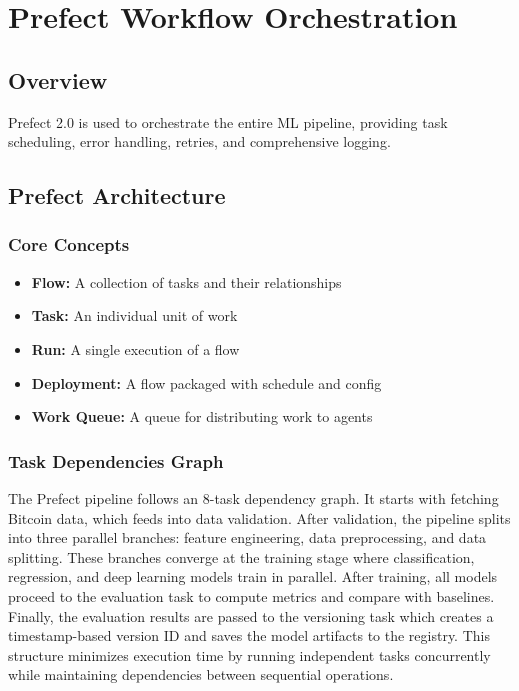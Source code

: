\chapter{Prefect Workflow Orchestration}
\label{ch:prefect}

\section{Overview}

Prefect 2.0 is used to orchestrate the entire ML pipeline, providing task scheduling, error handling, retries, and comprehensive logging.

\section{Prefect Architecture}

\subsection{Core Concepts}

\begin{itemize}
    \item \textbf{Flow:} A collection of tasks and their relationships
    \item \textbf{Task:} An individual unit of work
    \item \textbf{Run:} A single execution of a flow
    \item \textbf{Deployment:} A flow packaged with schedule and config
    \item \textbf{Work Queue:} A queue for distributing work to agents
\end{itemize}

\subsection{Task Dependencies Graph}

The Prefect pipeline follows an 8-task dependency graph. It starts with fetching Bitcoin data, which feeds into data validation. After validation, the pipeline splits into three parallel branches: feature engineering, data preprocessing, and data splitting. These branches converge at the training stage where classification, regression, and deep learning models train in parallel. After training, all models proceed to the evaluation task to compute metrics and compare with baselines. Finally, the evaluation results are passed to the versioning task which creates a timestamp-based version ID and saves the model artifacts to the registry. This structure minimizes execution time by running independent tasks concurrently while maintaining dependencies between sequential operations.

